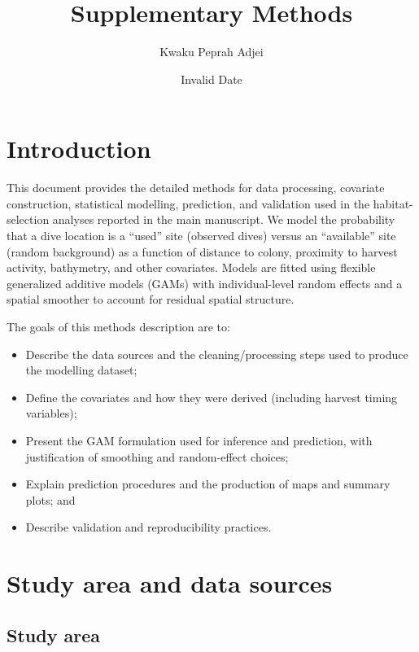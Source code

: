 \documentclass[
  letterpaper,
  DIV=11,
  numbers=noendperiod]{scrartcl}
\title{Supplementary Methods}
\author{Kwaku Peprah Adjei}
\date{Invalid Date}
\providecommand{\tightlist}{%
  \setlength{\itemsep}{0pt}\setlength{\parskip}{0pt}}
\renewcommand*\contentsname{Table of contents}
\newcommand\contentsname{Table of contents}
\begin{document}
\maketitle

\renewcommand*\contentsname{Table of contents}
{
\hypersetup{linkcolor=}
\setcounter{tocdepth}{3}
\tableofcontents
}

\section{Introduction}\label{introduction}

This document provides the detailed methods for data processing,
covariate construction, statistical modelling, prediction, and
validation used in the habitat-selection analyses reported in the main
manuscript. We model the probability that a dive location is a ``used''
site (observed dives) versus an ``available'' site (random background)
as a function of distance to colony, proximity to harvest activity,
bathymetry, and other covariates. Models are fitted using flexible
generalized additive models (GAMs) with individual-level random effects
and a spatial smoother to account for residual spatial structure.

The goals of this methods description are to:

\begin{itemize}
\tightlist
\item
  Describe the data sources and the cleaning/processing steps used to
  produce the modelling dataset;
\item
  Define the covariates and how they were derived (including harvest
  timing variables);
\item
  Present the GAM formulation used for inference and prediction, with
  justification of smoothing and random-effect choices;
\item
  Explain prediction procedures and the production of maps and summary
  plots; and
\item
  Describe validation and reproducibility practices.
\end{itemize}

\section{Study area and data sources}\label{study-area-and-data-sources}

\subsection{Study area}\label{study-area}
\end{document}

